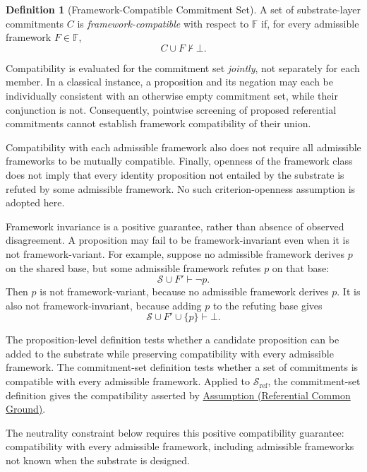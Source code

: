 \documentclass[11pt]{article}
\theoremstyle{plain}
\theoremstyle{definition}
\newtheorem{definition}[theorem]{Definition}
\theoremstyle{remark}
\newcommand{\AssumpRef}[2]{\hyperref[#1]{Assumption (#2)}}
\newcommand{\Substrate}{\mathcal{S}}
\newcommand{\SubstrateRef}{\mathcal{S}_{\mathrm{ref}}}
\newcommand{\Frameworks}{\mathbb{F}}
\newcommand{\Framework}{F}
\newcommand{\entails}{\vdash}
\newcommand{\notentails}{\nvdash}
\begin{document}
\begin{definition}[Framework-Compatible Commitment Set]
  \label{se100.def.FrameworkCompatibleCommitmentSet}
  A set of substrate-layer commitments $C$ is \emph{framework-compatible}
  with respect to $\Frameworks$ if, for every admissible framework
  $\Framework \in \Frameworks$,
  \[
    C \cup \Framework \notentails \bot .
  \]
\end{definition}

Compatibility is evaluated for the commitment set \emph{jointly},
not separately for each member. In a classical instance,
a proposition and its negation may each be individually consistent
with an otherwise empty commitment set, while their conjunction is not.
Consequently, pointwise screening of proposed referential commitments
cannot establish framework compatibility of their union.

Compatibility with each admissible framework also does not require
all admissible frameworks to be mutually compatible.
Finally, openness of the framework class does not imply
that every identity proposition not entailed by the substrate
is refuted by some admissible framework.
No such criterion-openness assumption is adopted here.

Framework invariance is a positive guarantee,
rather than absence of observed disagreement.
A proposition may fail to be framework-invariant
even when it is not framework-variant.
For example,
suppose no admissible framework derives $p$ on the shared base,
but some admissible framework refutes $p$ on that base:
\[
  \Substrate \cup \Framework' \entails \neg p .
\]
Then $p$ is not framework-variant, because no admissible framework derives $p$.
It is also not framework-invariant, because adding $p$ to the refuting base gives
\[
  \Substrate \cup \Framework' \cup \{p\} \entails \bot .
\]

The proposition-level definition tests whether a candidate proposition
can be added to the substrate while preserving compatibility with every
admissible framework.
The commitment-set definition tests whether a set of commitments is
compatible with every admissible framework.
Applied to $\SubstrateRef$,
the commitment-set definition gives the compatibility asserted by
\AssumpRef{se100.assump.ReferentialCommonGround}{Referential Common Ground}.

The neutrality constraint below requires this positive compatibility guarantee:
compatibility with every admissible framework,
including admissible frameworks not known when the substrate is designed.
\end{document}
